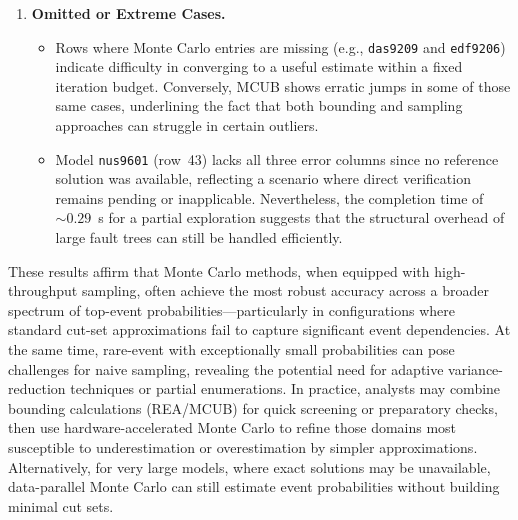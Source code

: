 \begin{enumerate}
    \item \textbf{Omitted or Extreme Cases.}
    \begin{itemize}
        \item Rows where Monte Carlo entries are missing (e.g., \texttt{das9209} and \texttt{edf9206}) indicate difficulty in converging to a useful estimate within a fixed iteration budget. Conversely, MCUB shows erratic jumps in some of those same cases, underlining the fact that both bounding and sampling approaches can struggle in certain outliers.
        \item Model \texttt{nus9601} (row~43) lacks all three error columns since no reference solution was available, reflecting a scenario where direct verification remains pending or inapplicable. Nevertheless, the completion time of \(\sim 0.29\)~s for a partial exploration suggests that the structural overhead of large fault trees can still be handled efficiently.
    \end{itemize}
\end{enumerate}

These results affirm that Monte Carlo methods, when equipped with high-throughput sampling, often achieve the most robust accuracy across a broader spectrum of top-event probabilities—particularly in configurations where standard cut-set approximations fail to capture significant event dependencies. At the same time, rare-event with exceptionally small probabilities can pose challenges for naive sampling, revealing the potential need for adaptive variance-reduction techniques or partial enumerations. In practice, analysts may combine bounding calculations (REA/MCUB) for quick screening or preparatory checks, then use hardware-accelerated Monte Carlo to refine those domains most susceptible to underestimation or overestimation by simpler approximations. Alternatively, for very large models, where exact solutions may be unavailable, data-parallel Monte Carlo can still estimate event probabilities without building minimal cut sets. 